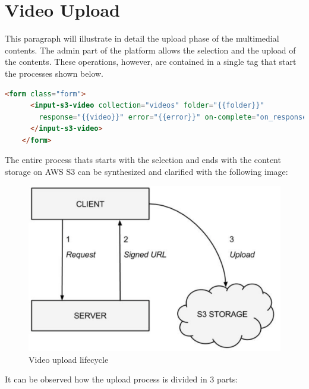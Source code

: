 \section{Video Upload}
\label{sec:video_upload}

This paragraph will illustrate in detail the upload phase of the multimedial contents.
The admin part of the platform allows the selection and the upload of the contents. These operations, however, are contained in a single tag that start the processes shown below.

\begin{lstlisting}[language=html]
   <form class="form">
      <input-s3-video collection="videos" folder="{{folder}}"
        response="{{video}}" error="{{error}}" on-complete="on_response">
      </input-s3-video>
    </form>
\end{lstlisting}

The entire process thats starts with the selection and ends with the content storage on AWS S3 can be synthesized and clarified with the following image:

\begin{figure}[htb]
 \centering
 \includegraphics[width=1.0\linewidth]{images/chapter5/upload.png}\hfill
 \caption[Video upload lifecycle]{Video upload lifecycle}
 \label{fig:fourV}
\end{figure}

It can be observed how the upload process is divided in 3 parts:

